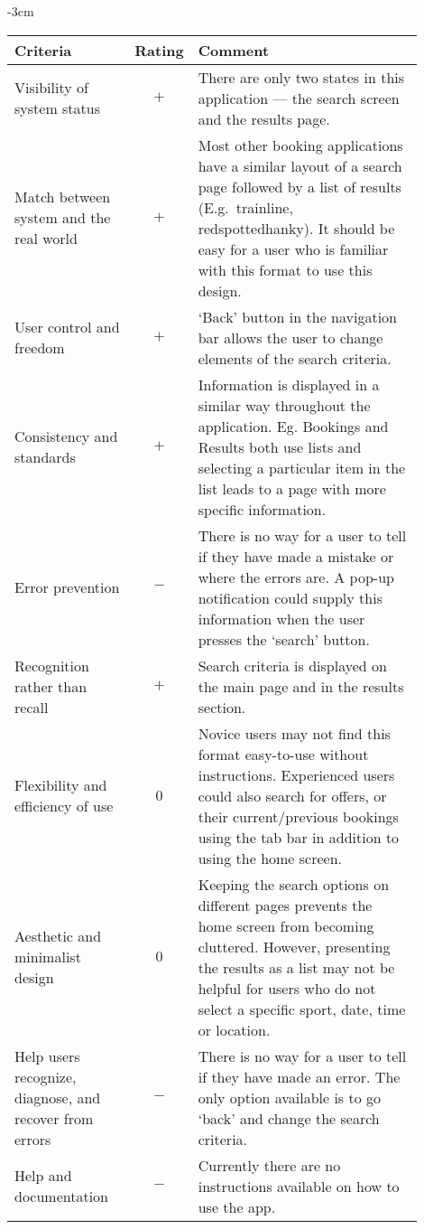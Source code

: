 \begin{center}
	\begin{adjustwidth*}{}{-3cm}
	\renewcommand{\arraystretch}{2}
	\begin{longtable}{@{\extracolsep{\fill}}p{0.3\linewidth} c p{0.6\linewidth}}
		\toprule
		\textbf{Criteria} & \textbf{Rating} & \textbf{Comment}\\
		\midrule
		Visibility of system status & $+$ & There are only two states in this
		application --- the search screen and the results page.\\

		Match between system and the real world & $+$ & Most other booking
		applications have a similar layout of a search page followed by a list
		of results (E.g.\ trainline, redspottedhanky). It should be easy for a
		user who is familiar with this format to use this design.\\

		User control and freedom & $+$ & `Back' button in the navigation bar
		allows the user to change elements of the search criteria.\\

		Consistency and standards & $+$ & Information is displayed in a similar
		way throughout the application. Eg.  Bookings and Results both use
		lists and selecting a particular item in the list leads to a page with
		more specific information.\\

		Error prevention & $-$ & There is no way for a user to tell if they
		have made a mistake or where the errors are. A pop-up notification
		could supply this information when the user presses the `search'
		button.\\

		Recognition rather than recall & $+$ & Search criteria is displayed on
		the main page and in the results section.\\

		Flexibility and efficiency of use & $0$ & Novice users may not find this
		format easy-to-use without instructions.  Experienced users could also
		search for offers, or their current/previous bookings using the tab bar
		in addition to using the home screen. \\

		Aesthetic and minimalist design & $0$ & Keeping the search options on
		different pages prevents the home screen from becoming cluttered.
		However, presenting the results as a list may not be helpful for users
		who do not select a specific sport, date, time or location.\\

		Help users recognize, diagnose, and recover from errors & $-$ & There
		is no way for a user to tell if they have made an error. The only
		option available is to go `back' and change the search criteria.\\

		Help and documentation & $-$ & Currently there are no instructions
		available on how to use the app.\\
		\bottomrule
	\end{longtable}
\end{adjustwidth*}
\end{center}

